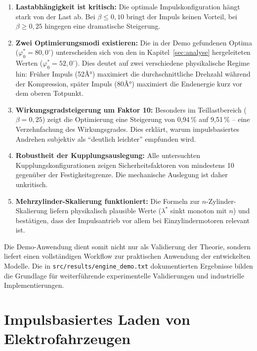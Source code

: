 ﻿\documentclass[a4paper,12pt]{article}
\begin{document}
\begin{enumerate}
  \item \textbf{Lastabhängigkeit ist kritisch:} Die optimale Impulskonfiguration
    hängt stark von der Last ab. Bei $\beta \leq 0{,}10$ bringt der Impuls
    keinen Vorteil, bei $\beta \geq 0{,}25$ hingegen eine dramatische Steigerung.

  \item \textbf{Zwei Optimierungsmodi existieren:} Die in der Demo gefundenen
    Optima ($\varphi_0^* = 80{,}0^\circ$) unterscheiden sich von den in
    Kapitel~\ref{sec:analyse} hergeleiteten Werten ($\varphi_0^* = 52{,}0^\circ$).
    Dies deutet auf zwei verschiedene physikalische Regime hin: Früher Impuls
    (52Â°) maximiert die durchschnittliche Drehzahl während der Kompression,
    später Impuls (80Â°) maximiert die Endenergie kurz vor dem oberen Totpunkt.

  \item \textbf{Wirkungsgradsteigerung um Faktor 10:} Besonders im Teillastbereich
    ($\beta = 0{,}25$) zeigt die Optimierung eine Steigerung von 0{,}94\,\%
    auf 9{,}51\,\% -- eine Verzehnfachung des Wirkungsgrades. Dies erklärt,
    warum impulsbasiertes Andrehen subjektiv als ``deutlich leichter''
    empfunden wird.

  \item \textbf{Robustheit der Kupplungsauslegung:} Alle untersuchten
    Kupplungskonfigurationen zeigen Sicherheitsfaktoren von mindestens 10
    gegenüber der Festigkeitsgrenze. Die mechanische Auslegung ist daher
    unkritisch.

  \item \textbf{Mehrzylinder-Skalierung funktioniert:} Die Formeln zur
    $n$-Zylinder-Skalierung liefern physikalisch plausible Werte ($\lambda^*$
    sinkt monoton mit $n$) und bestätigen, dass der Impulsantrieb vor allem
    bei Einzylindermotoren relevant ist.
\end{enumerate}

Die Demo-Anwendung dient somit nicht nur als Validierung der Theorie,
sondern liefert einen vollständigen Workflow zur praktischen Anwendung
der entwickelten Modelle. Die in \texttt{src/results/engine\_demo.txt}
dokumentierten Ergebnisse bilden die Grundlage für weiterführende
experimentelle Validierungen und industrielle Implementierungen.

\section{Impulsbasiertes Laden von Elektrofahrzeugen}
\label{sec:evcharging}
\end{document}
